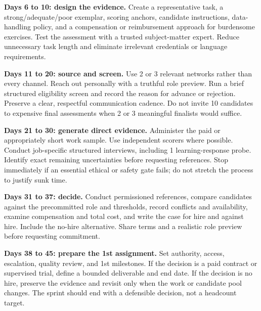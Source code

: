 \textbf{Days 6 to 10: design the evidence.} Create a representative task, a strong/adequate/poor exemplar, scoring anchors, candidate instructions, data-handling policy, and a compensation or reimbursement approach for burdensome exercises. Test the assessment with a trusted subject-matter expert. Reduce unnecessary task length and eliminate irrelevant credentials or language requirements.

\textbf{Days 11 to 20: source and screen.} Use 2 or 3 relevant networks rather than every channel. Reach out personally with a truthful role preview. Run a brief structured eligibility screen and record the reason for advance or rejection. Preserve a clear, respectful communication cadence. Do not invite 10 candidates to expensive final assessments when 2 or 3 meaningful finalists would suffice.

\textbf{Days 21 to 30: generate direct evidence.} Administer the paid or appropriately short work sample. Use independent scorers where possible. Conduct job-specific structured interviews, including 1 learning-response probe. Identify exact remaining uncertainties before requesting references. Stop immediately if an essential ethical or safety gate fails; do not stretch the process to justify sunk time.

\textbf{Days 31 to 37: decide.} Conduct permissioned references, compare candidates against the precommitted role and thresholds, record conflicts and availability, examine compensation and total cost, and write the case for hire and against hire. Include the no-hire alternative. Share terms and a realistic role preview before requesting commitment.

\textbf{Days 38 to 45: prepare the 1st assignment.} Set authority, access, escalation, quality review, and 1st milestones. If the decision is a paid contract or supervised trial, define a bounded deliverable and end date. If the decision is no hire, preserve the evidence and revisit only when the work or candidate pool changes. The sprint should end with a defensible decision, not a headcount target.

